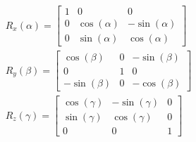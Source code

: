 \begin{subequations}
    \begin{gather}
        R_x(\alpha) =
        \begin{bmatrix}
            1 & 0            & 0             \\
            0 & \cos(\alpha) & -\sin(\alpha) \\
            0 & \sin(\alpha) & \cos(\alpha)
        \end{bmatrix} \\
        R_y(\beta) =
        \begin{bmatrix}
            \cos(\beta)  & 0 & -\sin(\beta) \\
            0            & 1 & 0            \\
            -\sin(\beta) & 0 & -\cos(\beta)
        \end{bmatrix} \\
        R_z(\gamma) =
        \begin{bmatrix}
            \cos(\gamma) & -\sin(\gamma) & 0 \\
            \sin(\gamma) & \cos(\gamma)  & 0 \\
            0            & 0             & 1
        \end{bmatrix}
    \end{gather}
\end{subequations}

\newcommand{\ca}{\mathrm{c}}
\newcommand{\sa}{\mathrm{s}}

